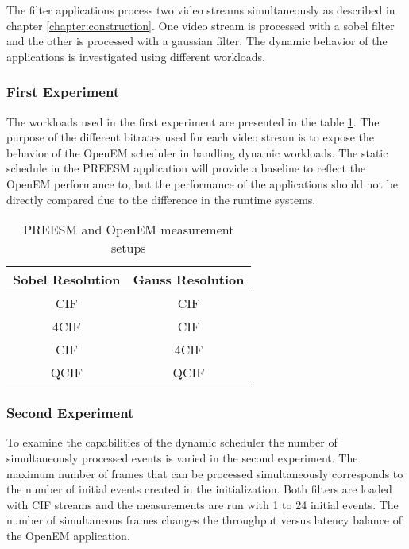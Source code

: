 The filter applications process two video streams simultaneously as described in chapter \ref{chapter:construction}. One video stream is processed with a sobel filter and the other is processed with a gaussian filter. The dynamic behavior of the applications is investigated using different workloads.

\subsubsection{First Experiment}
\label{subsubsec:first-experiment}
The workloads used in the first experiment are presented in the table \ref{tab:preesm_setups}. The purpose of the different bitrates used for each video stream is to expose the behavior of the OpenEM scheduler in handling dynamic workloads. The static schedule in the PREESM application will provide a baseline to reflect the OpenEM performance to, but the performance of the applications should not be directly compared due to the difference in the runtime systems.

\begin{table}
    \begin{center}
        \begin{tabular}{ c c }
            Sobel Resolution & Gauss Resolution \\ \hline
            CIF              & CIF              \\ \hline
            4CIF             & CIF              \\ \hline
            CIF              & 4CIF             \\ \hline
            QCIF             & QCIF             \\ \hline
        \end{tabular}
        \caption{PREESM and OpenEM measurement setups}
        \label{tab:preesm_setups}
    \end{center}
\end{table}

\subsubsection{Second Experiment}
\label{subsubsec:second-experiment}
To examine the capabilities of the dynamic scheduler the number of simultaneously processed events is varied in the second experiment. The maximum number of frames that can be processed simultaneously corresponds to the number of initial events created in the initialization. Both filters are loaded with CIF streams and the measurements are run with 1 to 24 initial events. The number of simultaneous frames changes the throughput versus latency balance of the OpenEM application.

